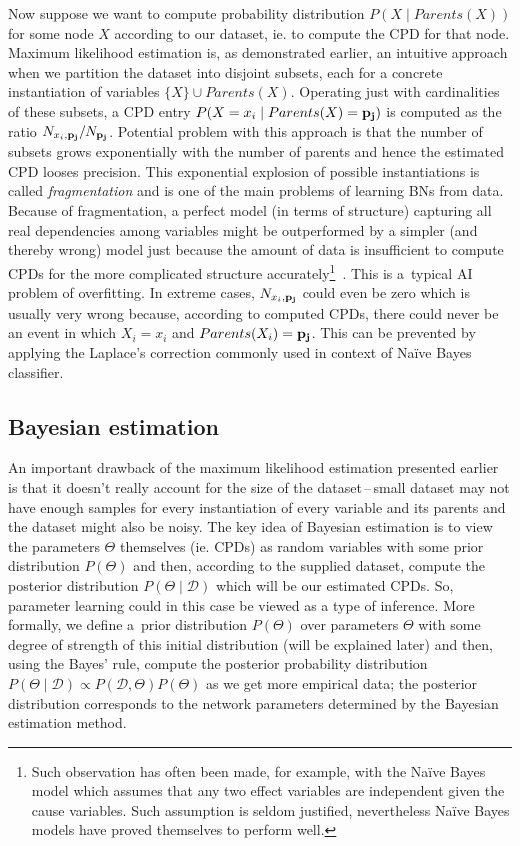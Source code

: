 \documentclass[english,cover]{fitthesis} %
\newcommand{\term}[1]{\emph{#1}}           %
\newcommand{\vars}[1]{{\bold{#1}}}         %
\begin{document}
Now suppose we want to compute probability distribution $P(X \mid Parents(X))$ for some node $X$ according to our dataset, ie. to compute the CPD for that node. Maximum likelihood estimation is, as demonstrated earlier, an intuitive approach when we partition the dataset into disjoint subsets, each for a concrete instantiation of variables $\lbrace X \rbrace \cup Parents(X)$. Operating just with cardinalities of these subsets, a CPD entry $P(X=x_i \mid Parents(X) = \vars{p_j})$ is computed as the ratio $N_{x_i,\vars{p_j}} / N_{\vars{p_j}}$. Potential problem with this approach is that the number of subsets grows exponentially with the number of parents and hence the estimated CPD looses precision. This exponential explosion of possible instantiations is called \term{fragmentation} and is one of the main problems of learning BNs from data. Because of fragmentation, a perfect model (in terms of structure) capturing all real dependencies among variables might be outperformed by a simpler (and thereby wrong) model just because the amount of data is insufficient to compute CPDs for the more complicated structure accurately\footnote{Such observation has often been made, for example, with the Naïve Bayes model which assumes that any two effect variables are independent given the cause variables. Such assumption is seldom justified, nevertheless Naïve Bayes models have proved themselves to perform well.}~\cite{pgm}. This is a~typical AI problem of overfitting. In extreme cases, $N_{x_i,\vars{p_j}}$ could even be zero which is usually very wrong because, according to computed CPDs, there could never be an event in which $X_i = x_i$ and $Parents(X_i) = \vars{p_j}$. This can be prevented by applying the Laplace's correction commonly used in context of Naïve Bayes classifier.


\subsection{Bayesian estimation}
An important drawback of the maximum likelihood estimation presented earlier is that it doesn't really account for the size of the dataset\,--\,small dataset may not have enough samples for every instantiation of every variable and its parents and the dataset might also be noisy. The key idea of Bayesian estimation is to view the parameters $\Theta$ themselves (ie. CPDs) as random variables with some prior distribution $P(\Theta)$ and then, according to the supplied dataset, compute the posterior distribution $P(\Theta \mid \mathcal{D})$ which will be our estimated CPDs. So, parameter learning could in this case be viewed as a type of inference.
More formally, we define a~prior distribution $P(\Theta)$ over parameters $\Theta$ with some degree of strength of this initial distribution (will be explained later) and then, using the Bayes' rule, compute the posterior probability distribution $P(\Theta \mid \mathcal{D}) \propto P(\mathcal{D},\Theta) P(\Theta)$ as we get more empirical data; the posterior distribution corresponds to the network parameters determined by the Bayesian estimation method.
\end{document}
